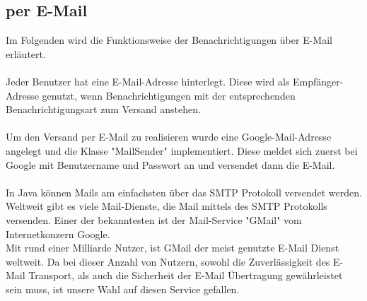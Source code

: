 \subsection{per E-Mail}

Im Folgenden wird die Funktionsweise der Benachrichtigungen über E-Mail erläutert.
\\\\
Jeder Benutzer hat eine E-Mail-Adresse hinterlegt. Diese wird als Empfänger-Adresse genutzt, wenn Benachrichtigungen mit der entsprechenden Benachrichtigungsart zum Versand anstehen.
\\\\
Um den Versand per E-Mail zu realisieren wurde eine Google-Mail-Adresse angelegt und die Klasse "MailSender" implementiert. Diese meldet sich zuerst bei Google mit Benutzername und Passwort an und versendet dann die E-Mail.
\\\\
In Java können Mails am einfachsten über das SMTP Protokoll versendet werden. Weltweit gibt es viele Mail-Dienste, die Mail mittels des SMTP Protokolls versenden. Einer der bekanntesten ist der Mail-Service "GMail" vom Internetkonzern Google. 
\\
Mit rund einer Milliarde Nutzer, ist GMail der meist genutzte E-Mail Dienst weltweit. Da bei dieser Anzahl von Nutzern, sowohl die Zuverlässigkeit des E-Mail Transport, als auch die Sicherheit der E-Mail Übertragung gewährleistet sein muss, ist unsere Wahl auf diesen Service gefallen.